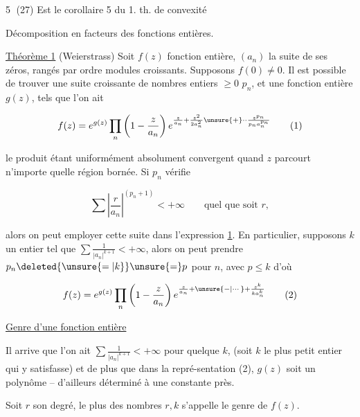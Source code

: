 \textcircled{5} (27) Est le corollaire 5 du 1. th. de convexité 



Décomposition en facteurs des fonctions entières.

\uline{Théorème 1} (Weierstrass) Soit $f(z)$ fonction entière, $(a_n)$ la suite de ses zéros, rangés par ordre  modules croissants. Supposons $f(0)\ne0$. Il est possible de trouver une suite croissante de nombres entiers $\geq0$ $p_n$, et une fonction entière $g(z)$, tels que l'on ait

\[
 f(z)=e^{g(z)}\prod_n\left(1-\frac{z}{a_n}\right)e^{\frac{z}{a_n}+\frac{z^2}{2a_n^2}\unsure{+}\mathord{\cdot}\mathord{\cdot}\frac{z^{p_n}}{p_n a_n^{p_n}}} \tag*{(1)}
\]

le produit étant uniformément absolument convergent quand $z$ parcourt n'importe quelle région bornée. Si   $p_n$ vérifie

\[
 \sum\left|\frac{r}{a_n}\right|^{(p_n+1)}<+\infty\qquad\text{quel que soit }r,
\]

alors on peut employer cette suite dans l'expression \uline{1}. En particulier, supposons $k$ un entier tel que $\sum\frac{1}{|a_n|^{k+1}}<+\infty$, alors on peut prendre $p_n\deleted{\unsure{=|k}}\unsure{=}p$ pour  $n$, avec $p\leq k$ d'où

\[
 f(z)=e^{g(z)}\prod_n\left(1-\frac{z}{a_n}\right)e^{\frac{z}{a_n}+\unsure{-|\cdots}+\frac{z^k}{ka_n^k}} \tag*{(2)}
\]




\uline{Genre d'une fonction entière}

Il arrive que l'on ait $\sum\frac{1}{|a_n|^{k+1}}<+\infty$ pour quelque $k$, (soit $k$ le plus petit entier qui y satisfasse) et de plus que dans la repré-\newline sentation (2), $g(z)$ soit un polynôme -- d'ailleurs déterminé à une constante près.

Soit $r$ son degré, le plus   des nombres $r,k$ s'appelle le genre de $f(z)$.

